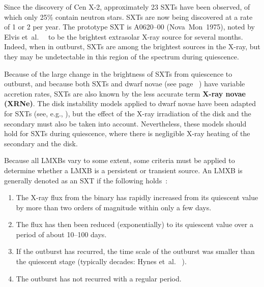 \vspace{\myparskip}

Since the discovery of Cen X-2, approximately 23 SXTs have been
observed, of which only 25\% contain neutron stars. SXTs are now being
discovered at a rate of 1 or 2 per year. The prototype SXT is A0620--00
(\mbox{Nova Mon 1975}), noted by Elvis et~al.\ %
\citeyear{Elvis_et_al.:1975}%
\ to be the brightest extrasolar X-ray source for several months. %
Indeed, when in outburst, SXTs are among the brightest sources in the X-ray, but they may be undetectable in this region of the spectrum during quiescence. %

\vspace{\myparskip}

Because of the large change in the brightness of SXTs from quiescence
to outburst, and because both SXTs and dwarf novae (see page~%
\pageref{cha:Introduction:sec:X-rayBinaries:subsec:CompactObjects:topic:DwarfNovae}%
) have variable accretion rates, SXTs are also known by the less accurate term \textbf{X-ray novae
(XRNe)}. The disk instability models applied to dwarf novae have been adapted for
SXTs (see, e.g., %
%
), but the effect of the X-ray irradiation of the disk and the secondary must
also be taken into account. Nevertheless, these models should hold for SXTs during quiescence,
where there is negligible X-ray heating of the secondary and the
disk. %

\vspace{\myparskip}


Because all LMXBs vary to some extent, some criteria must be applied to determine whether a LMXB is a persistent or
transient source. An LMXB is generally denoted as an SXT if the following holds~\cite{TanakaShibazaki:1996}:
\begin{enumerate}
\item\label{cha:Introduction:sec:X-rayBinaries:subsec:CriteriaForSXTs:enu:flux}
The X-ray flux from the binary has rapidly increased from its quiescent
value by more than two orders of magnitude within only a few days.
\item\label{cha:Introduction:sec:X-rayBinaries:subsec:CriteriaForSXTs:enu:reduction}
The flux has then been reduced (exponentially) to its quiescent value
over a period of about 10--100 days.
\item\label{cha:Introduction:sec:X-rayBinaries:subsec:CriteriaForSXTs:enu:outburst}
If the outburst has recurred, the time scale of the outburst was
smaller than the quiescent stage (typically decades: Hynes et~al.\ %
). %
\item\label{cha:Introduction:sec:X-rayBinaries:subsec:CriteriaForSXTs:enu:recur}
The outburst has not recurred with a regular period.
\end{enumerate}

